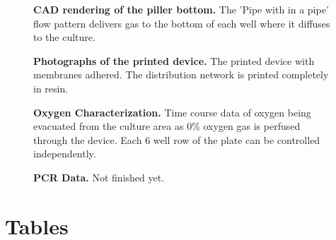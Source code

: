 
\begin{figure}
\caption{
{\bf CAD rendering of the piller bottom.} The 'Pipe with in a pipe' flow pattern delivers gas to the bottom of each well where it diffuses to the culture.  
}
\label{piller-well-render-figure}
\end{figure}

\begin{figure}
\caption{
{\bf Photographs of the printed device.}  The printed device with membranes adhered. The distribution network is printed completely in resin.
}
\label{device-photos-figure}
\end{figure}

\begin{figure}
\caption{
{\bf Oxygen Characterization.}  Time course data of oxygen being evacuated from the culture area as 0\% oxygen gas is perfused through the device. Each 6 well row of the plate can be controlled independently.  
}
\label{oxygen-char-figure}
\end{figure}

\begin{figure}
\caption{
{\bf PCR Data.}  Not finished yet.  
}
\label{pcr-data}
\end{figure}



\section*{Tables}
% 
%
%

